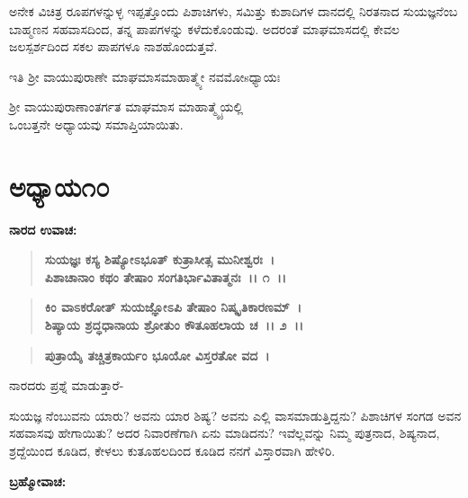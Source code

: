 ಅನೇಕ ವಿಚಿತ್ರ ರೂಪಗಳನ್ನುಳ್ಳ ಇಪ್ಪತ್ತೊಂದು ಪಿಶಾಚಿಗಳು, ಸಮಿತ್ತು ಕುಶಾದಿಗಳ ದಾನದಲ್ಲಿ ನಿರತನಾದ ಸುಯಜ್ಞನೆಂಬ ಬಾಹ್ಮಣನ ಸಹವಾಸದಿಂದ, ತನ್ನ ಪಾಪಗಳನ್ನು ಕಳೆದುಕೊಂಡುವು. ಅದರಂತೆ ಮಾಘಮಾಸದಲ್ಲಿ ಕೇವಲ ಜಲಸ್ಪರ್ಶದಿಂದ ಸಕಲ ಪಾಪಗಳೂ ನಾಶಹೊಂದುತ್ತವೆ.

\begin{center}
ಇತಿ ಶ‍್ರೀ ವಾಯುಪುರಾಣೇ ಮಾಘಮಾಸಮಾಹಾತ್ಮ್ಯೇ ನವಮೋsಧ್ಯಾಯಃ 
\end{center}

\begin{center}
ಶ‍್ರೀ ವಾಯುಪುರಾಣಾಂತರ್ಗತ ಮಾಘಮಾಸ ಮಾಹಾತ್ಮ್ಯೈಯಲ್ಲಿ \\ ಒಂಬತ್ತನೇ ಅಧ್ಯಾಯವು ಸಮಾಪ್ತಿಯಾಯಿತು.
\end{center}

\newpage

\section*{ಅಧ್ಯಾಯ\enginline{-}೧೦}

\emptypage

\begin{flushleft}
\textbf{ನಾರದ ಉವಾಚ:\enginline{-} }
\end{flushleft}

\begin{verse}
\textbf{ಸುಯಜ್ಞಃ ಕಸ್ಯ ಶಿಷ್ಯೋಽಭೂತ್ ಕುತ್ರಾಸೀತ್ಸ ಮುನೀಶ್ವರಃ~।}\\\textbf{ಪಿಶಾಚಾನಾಂ ಕಥಂ ತೇಷಾಂ ಸಂಗತಿರ್ಭಾವಿತಾತ್ಮನಃ~।। ೧~।। }
\end{verse}

\begin{verse}
\textbf{ಕಿಂ ವಾಽಕರೋತ್ ಸುಯಜ್ಞೋಽಪಿ ತೇಷಾಂ ನಿಷ್ಕೃತಿಕಾರಣಮ್~।}\\\textbf{ಶಿಷ್ಯಾಯ ಶ್ರದ್ಧಧಾನಾಯ ಶ್ರೋತುಂ ಕೌತೂಹಲಾಯ ಚ~।। ೨~।।}
\end{verse}

\begin{verse}
\textbf{ಪುತ್ರಾಯೈ ತಚ್ಚಿತ್ರಕಾರ್ಯಂ ಭೂಯೋ ವಿಸ್ತರತೋ ವದ~।}
\end{verse}

\begin{flushleft}
ನಾರದರು ಪ್ರಶ್ನೆ ಮಾಡುತ್ತಾರೆ-
\end{flushleft}

ಸುಯಜ್ಞ ನೆಂಬುವನು ಯಾರು? ಅವನು ಯಾರ ಶಿಷ್ಯ? ಅವನು ಎಲ್ಲಿ ವಾಸಮಾಡುತ್ತಿದ್ದನು? ಪಿಶಾಚಿಗಳ ಸಂಗಡ ಅವನ ಸಹವಾಸವು ಹೇಗಾಯಿತು? ಅದರ ನಿವಾರಣೆಗಾಗಿ ಏನು ಮಾಡಿದನು? ಇವೆಲ್ಲವನ್ನು ನಿಮ್ಮ ಪುತ್ರನಾದ, ಶಿಷ್ಯನಾದ, ಶ್ರದ್ದೆಯಿಂದ ಕೂಡಿದ, ಕೇಳಲು ಕುತೂಹಲದಿಂದ ಕೂಡಿದ ನನಗೆ ವಿಸ್ತಾರವಾಗಿ ಹೇಳಿರಿ.

\begin{flushleft}
\textbf{ಬ್ರಹ್ಮೋವಾಚ:\enginline{-}}
\end{flushleft}

